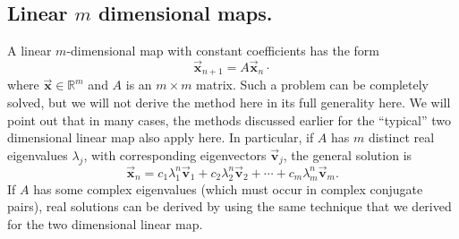 \documentclass[reqno]{immbook}
\newcommand{\Real}{\mathbb{R}}
\newcommand{\BV}{\vec{\textbf{v}}}
\newcommand{\BX}{\vec{\textbf{x}}}
\numberwithin{equation}{chapter}
\numberwithin{question}{section}
\numberwithin{theorem}{chapter}
\numberwithin{figure}{chapter}
\theoremstyle{definition}
\begin{document}
\subsection*{Linear $m$ dimensional maps.}
A linear $m$-dimensional map with constant coefficients has the form
\begin{equation}
  \BX_{n+1} = A\BX_{n}
\label{eqn:linearmapmdim}\cdot
\end{equation}
where $\BX\in \Real^m$ and $A$ is an $m\times m$ matrix.
Such a problem can be completely solved, but we will not
derive the method here in its full generality here.
We will point out that in
many cases, the methods discussed earlier for the
``typical'' two dimensional linear map also apply here.
In particular, if $A$ has $m$ distinct real eigenvalues
$\lambda_j$, with corresponding eigenvectors
$\BV_j$, the general solution is
\begin{equation}
   \BX_n = c_1 \lambda_1^n \BV_1 + c_2 \lambda_2^n \BV_2
                 + \cdots + c_m \lambda_m^n\BV_m.
\label{eqn:linearmdimreal}
\end{equation}
%
If $A$ has some complex eigenvalues (which must occur in
complex conjugate pairs), real solutions can be derived
by using the same technique that we derived for the
two dimensional linear map.
\end{document}
